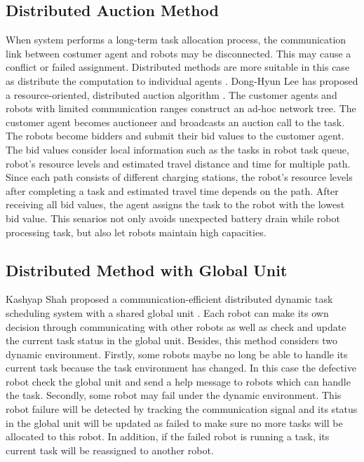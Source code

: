 \subsection{Distributed Auction Method}
\label{sec:auction_method}
When system performs a long-term task allocation process, the communication link between costumer agent and robots may be disconnected. This may cause a conflict or failed assignment. 
Distributed methods are more suitable in this case as distribute the computation to individual agents \cite{NUNES201755}. 
Dong-Hyun Lee has proposed a resource-oriented, distributed auction algorithm \cite{Dong2015}. The customer agents and robots with limited communication ranges construct an ad-hoc network tree. The customer agent becomes auctioneer and broadcasts an auction call to the task. The robots become bidders and submit their bid values to the customer agent. The bid values consider local information such as the tasks in robot task queue, robot's resource levels and estimated travel distance and time for multiple path. Since each path consists of different charging stations, the robot's resource levels after completing a task and estimated travel time depends on the path. After receiving all bid values, the agent assigns the task to the robot with the lowest bid value. This senarios not only avoids unexpected battery drain while robot processing task, but also let robots maintain high capacities. 

\subsection{Distributed Method with Global Unit}
\label{sec:global_unit_method}
Kashyap Shah proposed a communication-efficient distributed dynamic task scheduling system with a shared global unit \cite{Shah7}. Each robot can make its own decision through communicating with other robots as well as check and update the current task status in the global unit. Besides, this method considers two dynamic environment. 
Firstly, some robots maybe no long be able to handle its current task because the task environment has changed. In this case the defective robot check the global unit and send a help message to robots which can handle the task. Secondly, some robot may fail under the dynamic environment. This robot failure will be detected by tracking the communication signal and its status in the global unit will be updated as failed to make sure no more tasks will be allocated to this robot. In addition, if the failed robot is running a task, its current task will be reassigned to another robot. 

